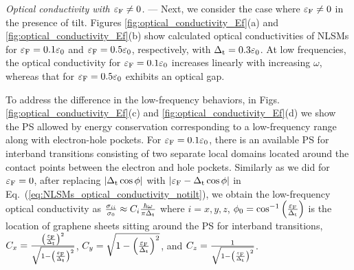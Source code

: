 \documentclass[aps,twocolumn,floatfix]{revtex4-1}
\begin{document}
{\em Optical conductivity with $\varepsilon_{\rm F}\neq0$.} ---
Next, we consider the case where $\varepsilon_{\rm F}\neq0$ in the presence of tilt. Figures \ref{fig:optical_conductivity_Ef}(a) and \ref{fig:optical_conductivity_Ef}(b) show calculated optical conductivities of NLSMs for $\varepsilon_{\rm F}=0.1\varepsilon_0$ and $\varepsilon_{\rm F}=0.5\varepsilon_0$, respectively, with $\Delta_{\rm t}=0.3 \varepsilon_0$. At low frequencies, the optical conductivity for $\varepsilon_{\rm F}=0.1\varepsilon_0$ increases linearly with increasing $\omega$, whereas that for $\varepsilon_{\rm F}=0.5\varepsilon_0$ exhibits an optical gap.

To address the difference in the low-frequency behaviors, in Figs. \ref{fig:optical_conductivity_Ef}(c) and \ref{fig:optical_conductivity_Ef}(d) we show the PS allowed by energy conservation corresponding to a low-frequency range along with electron-hole pockets. For $\varepsilon_{\rm F}=0.1\varepsilon_0$, there is an available PS for interband transitions consisting of two separate local domains located around the contact points between the electron and hole pockets. Similarly as we did for $\varepsilon_{\rm F}=0$, after replacing $\left|\Delta_{\rm t}\cos{\phi}\right|$ with $\left|\varepsilon_{\rm F}-\Delta_{\rm t}\cos{\phi}\right|$ in Eq.~(\ref{eq:NLSMs_optical_conductivity_notilt}),  we obtain the low-frequency optical conductivity as ${\sigma_{ii}\over \sigma_0} \approx C_i\frac{\hbar\omega}{\pi \Delta_{\rm t}}$ 
where $i=x,y,z$, $\phi_0=\cos^{-1}\left(\frac{\varepsilon_{\rm F}}{\Delta_{\rm t}}\right)$ is the location of graphene sheets sitting around the PS for interband transitions,
$C_x=\frac{\left(\frac{\varepsilon_{\rm F}}{\Delta_{\rm t}}\right)^2}{\sqrt{1-\left(\frac{\varepsilon_{\rm F}}{\Delta_{\rm t}}\right)^2}}$,
$C_y=\sqrt{1-\left(\frac{\varepsilon_{\rm F}}{\Delta_{\rm t}}\right)^2}$, and
$C_z=\frac{1}{\sqrt{1-\left(\frac{\varepsilon_{\rm F}}{\Delta_{\rm t}}\right)^2}}$.
\end{document}
